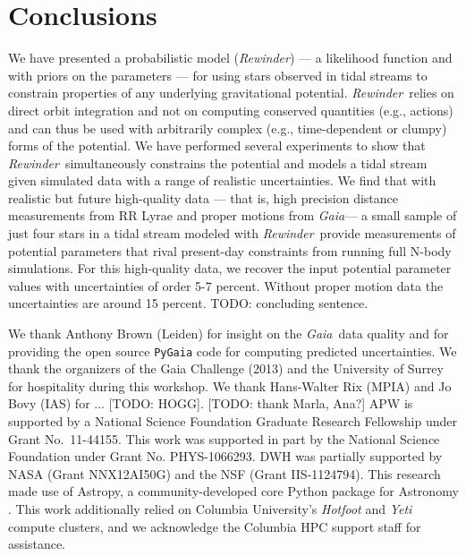 \documentclass[letterpaper,12pt,preprint]{aastex}
\newcommand{\project}[1]{\textsl{#1}}
\newcommand{\gaia}{\project{Gaia}}
\newcommand{\rewinder}{\emph{Rewinder}}
\begin{document}
\section{Conclusions}\label{sec:conclusion}
We have presented a probabilistic model (\rewinder) --- a likelihood function and with priors on the parameters --- for using stars observed in tidal streams to constrain properties of any underlying gravitational potential. \rewinder\ relies on direct orbit integration and not on computing conserved quantities (e.g., actions) and can thus be used with arbitrarily complex (e.g., time-dependent or clumpy) forms of the potential. We have performed several experiments to show that \rewinder\ simultaneously constrains the potential and models a tidal stream given simulated data with a range of realistic uncertainties. We find that with realistic but future high-quality data --- that is, high precision distance measurements from RR Lyrae and proper motions from \gaia --- a small sample of just four stars in a tidal stream modeled with \rewinder\, provide measurements of potential parameters that rival present-day constraints from running full N-body simulations. For this high-quality data, we recover the input potential parameter values with uncertainties of order 5-7 percent. Without proper motion data the uncertainties are around 15 percent. TODO: concluding sentence.

\acknowledgements
We thank Anthony Brown (Leiden) for insight on the \gaia\, data quality and for providing the open source \texttt{PyGaia} code for computing predicted uncertainties. We thank the organizers of the Gaia Challenge (2013) and the University of Surrey for hospitality during this workshop. We thank Hans-Walter Rix (MPIA) and Jo Bovy (IAS) for ... [TODO: HOGG].
[TODO: thank Marla, Ana?]
APW is supported by a National Science Foundation Graduate Research Fellowship under Grant No.\ 11-44155. This work was supported in part by the National Science Foundation under Grant No. PHYS-1066293. 
DWH was partially supported by NASA (Grant NNX12AI50G) and the NSF (Grant IIS-1124794).
This research made use of Astropy, a community-developed core Python package for Astronomy \citep{astropy13}.
This work additionally relied on Columbia University's \emph{Hotfoot} and \emph{Yeti} compute clusters, and we acknowledge the Columbia HPC support staff for assistance. \\



\end{document}
